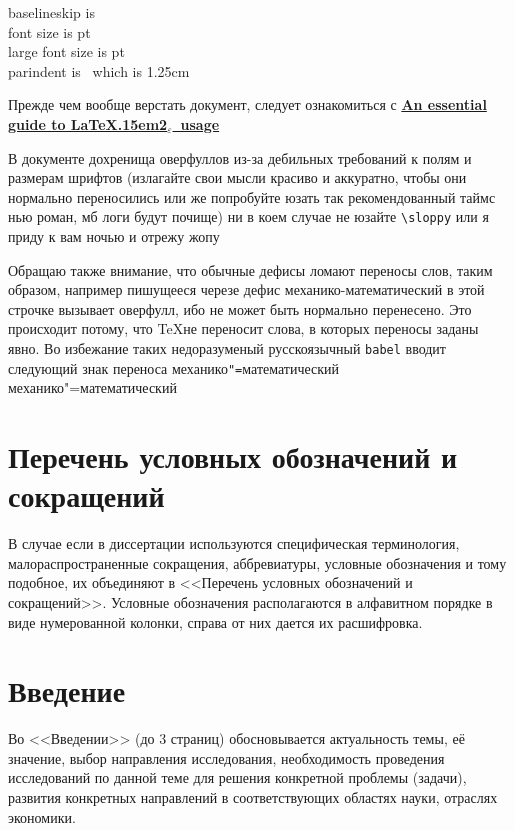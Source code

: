 \documentclass{mpaper}
\renewcommand{\LaTeXe}{\LaTeX\kern.15em2$_{\textstyle\varepsilon}$}
\begin{document}
    \maketitle
    \setcounter{tocdepth}{3}
    \setcounter{page}{2}
    \tableofcontents

    \newpage
    \noindent baselineskip is \the\baselineskip\\
    font size is \makeatletter\f@size\makeatother pt\\
    large font size is {\normalsizerrr \makeatletter\f@size\makeatother} pt\\
    parindent is \the\parindent\ which is 1.25cm

    Прежде чем вообще верстать документ, следует ознакомиться с \href{http://anorien.csc.warwick.ac.uk/mirrors/CTAN/info/l2tabu/english/l2tabuen.pdf}{\bfseries An essential guide to \LaTeXe\ usage}

    В документе дохренища оверфуллов из-за дебильных требований к полям и размерам шрифтов (излагайте свои мысли красиво и аккуратно, чтобы они нормально переносились или же попробуйте юзать так рекомендованный таймс нью роман, мб логи будут почище) ни в коем случае не юзайте \verb|\sloppy| или я приду к вам ночью и отрежу жопу
    
    Обращаю также внимание, что обычные дефисы ломают переносы слов, таким образом, например пишущееся черезе дефис механико-математический в этой строчке вызывает оверфулл, ибо не может быть нормально перенесено. Это происходит потому, что \TeX не переносит слова, в которых переносы заданы явно. Во избежание таких недоразуменый русскоязычный \verb|babel| вводит следующий знак переноса механико\verb|"=|математический механико"=математический

    \chapter*{Перечень условных обозначений и сокращений}
    В случае если в диссертации используются специфическая терминология, малораспространенные сокращения, аббревиатуры, условные обозначения и тому подобное, их объединяют в <<Перечень условных обозначений и сокращений>>. Условные обозначения располагаются в алфавитном порядке в виде нумерованной колонки, справа от них дается их расшифровка.
    \chapter*{Введение}
    Во <<Введении>> (до 3 страниц) обосновывается актуальность темы, её значение, выбор направления исследования, необходимость проведения исследований по данной теме для решения конкретной проблемы (задачи), развития конкретных направлений в соответствующих областях науки, отраслях экономики.
\end{document}
